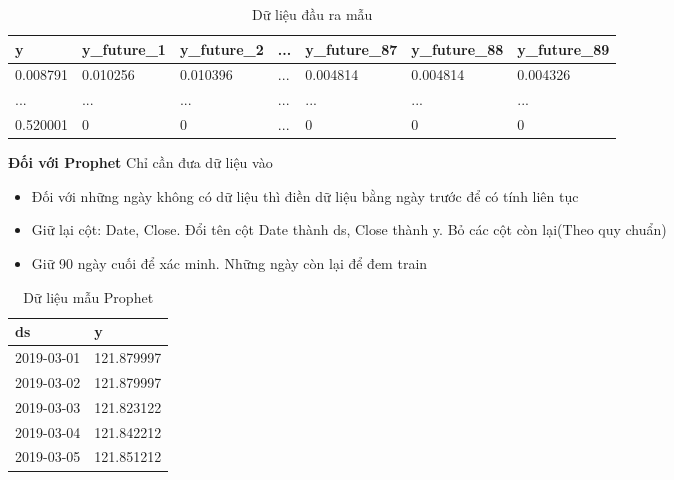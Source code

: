\begin{table}[h]
	\begin{tabularx}{\textwidth}{X | X | X | X | X | X | X } 
		y	& y\_future\_1 & y\_future\_2	& ...	& y\_future\_87	 & y\_future\_88	 & y\_future\_89		\\ \hline
		0.008791	& 0.010256	& 0.010396		& ... & 0.004814	& 0.004814	& 0.004326\\ \hline
		...	& ...	& ...	& ... & ...	& ...	& ... \\ \hline
		0.520001	& 0	& 0		& ... & 0	& 0	& 0\\ %
\end{tabularx}
	\label{tab:table_output}
	\caption{Dữ liệu đầu ra mẫu}
\end{table}


\textbf{Đối với Prophet}
Chỉ cần đưa dữ liệu vào
\begin{itemize}
    \item Đối với những ngày không có dữ liệu thì điền dữ liệu bằng ngày trước để có tính liên tục \\
    \item Giữ lại cột: Date, Close. Đổi tên cột Date thành ds, Close thành y. Bỏ các cột còn lại(Theo quy chuẩn) \\
    \item Giữ 90 ngày cuối để xác minh. Những ngày còn lại để đem train \\
\end{itemize}
\begin{table}[h]
	\begin{tabularx}{\textwidth}{X | X } 
		ds	& y	  \\ \hline
		2019-03-01	& 121.879997 \\ \hline
		2019-03-02	& 121.879997 \\ \hline
		2019-03-03	& 121.823122 \\ \hline
		2019-03-04	& 121.842212 \\ \hline
		2019-03-05	& 121.851212 \\ %
	\end{tabularx}
	\label{tab:data_prophet}
	\caption{Dữ liệu mẫu Prophet}
\end{table}

